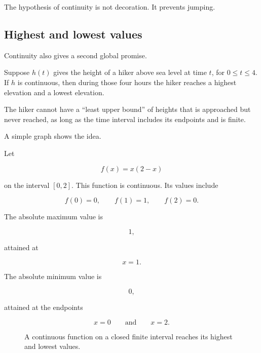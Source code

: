 The hypothesis of continuity is not decoration.  It prevents jumping.

\subsection{Highest and lowest values}
\label{subsec:highest-lowest-values}

Continuity also gives a second global promise.

Suppose \(h(t)\) gives the height of a hiker above sea level at time \(t\), for \(0\le t\le4\).  If \(h\) is continuous, then during those four hours the hiker reaches a highest elevation and a lowest elevation.

The hiker cannot have a ``least upper bound'' of heights that is approached but never reached, as long as the time interval includes its endpoints and is finite.

A simple graph shows the idea.

Let

\[
f(x)=x(2-x)
\]

on the interval \([0,2]\).  This function is continuous.  Its values include

\[
f(0)=0,
\qquad
f(1)=1,
\qquad
f(2)=0.
\]

The absolute maximum value is

\[
1,
\]

attained at

\[
x=1.
\]

The absolute minimum value is

\[
0,
\]

attained at the endpoints

\[
x=0
\qquad\text{and}\qquad
x=2.
\]

\begin{figure}[h]
\centering
{}
\caption{A continuous function on a closed finite interval reaches its highest and lowest values.}
\label{fig:evt-parabola}
\end{figure}

